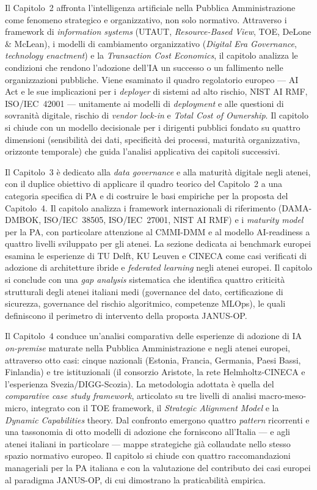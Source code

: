 Il Capitolo~2 affronta l'intelligenza artificiale nella Pubblica Amministrazione come fenomeno strategico e organizzativo, non solo normativo. Attraverso i framework di \textit{information systems} (UTAUT, \textit{Resource-Based View}, TOE, DeLone \& McLean), i modelli di cambiamento organizzativo (\textit{Digital Era Governance}, \textit{technology enactment}) e la \textit{Transaction Cost Economics}, il capitolo analizza le condizioni che rendono l'adozione dell'IA un successo o un fallimento nelle organizzazioni pubbliche. Viene esaminato il quadro regolatorio europeo --- AI Act e le sue implicazioni per i \textit{deployer} di sistemi ad alto rischio, NIST AI RMF, ISO/IEC~42001 --- unitamente ai modelli di \textit{deployment} e alle questioni di sovranità digitale, rischio di \textit{vendor lock-in} e \textit{Total Cost of Ownership}. Il capitolo si chiude con un modello decisionale per i dirigenti pubblici fondato su quattro dimensioni (sensibilità dei dati, specificità dei processi, maturità organizzativa, orizzonte temporale) che guida l'analisi applicativa dei capitoli successivi.

Il Capitolo~3 è dedicato alla \textit{data governance} e alla maturità digitale negli atenei, con il duplice obiettivo di applicare il quadro teorico del Capitolo~2 a una categoria specifica di PA e di costruire le basi empiriche per la proposta del Capitolo~4. Il capitolo analizza i framework internazionali di riferimento (DAMA-DMBOK, ISO/IEC~38505, ISO/IEC~27001, NIST AI RMF) e i \textit{maturity model} per la PA, con particolare attenzione al CMMI-DMM e al modello AI-readiness a quattro livelli sviluppato per gli atenei. La sezione dedicata ai benchmark europei esamina le esperienze di TU Delft, KU Leuven e CINECA come casi verificati di adozione di architetture ibride e \textit{federated learning} negli atenei europei. Il capitolo si conclude con una \textit{gap analysis} sistematica che identifica quattro criticità strutturali degli atenei italiani medi (governance del dato, certificazione di sicurezza, governance del rischio algoritmico, competenze MLOps), le quali definiscono il perimetro di intervento della proposta JANUS-OP.

Il Capitolo~4 conduce un'analisi comparativa delle esperienze di adozione di IA \textit{on-premise} maturate nella Pubblica Amministrazione e negli atenei europei, attraverso otto casi: cinque nazionali (Estonia, Francia, Germania, Paesi Bassi, Finlandia) e tre istituzionali (il consorzio Aristote, la rete Helmholtz-CINECA e l'esperienza Svezia/DIGG-Scozia). La metodologia adottata è quella del \textit{comparative case study framework}, articolato su tre livelli di analisi macro-meso-micro, integrato con il TOE framework, il \textit{Strategic Alignment Model} e la \textit{Dynamic Capabilities} theory. Dal confronto emergono quattro \textit{pattern} ricorrenti e una tassonomia di otto modelli di adozione che forniscono all'Italia --- e agli atenei italiani in particolare --- mappe strategiche già collaudate nello stesso spazio normativo europeo. Il capitolo si chiude con quattro raccomandazioni manageriali per la PA italiana e con la valutazione del contributo dei casi europei al paradigma JANUS-OP, di cui dimostrano la praticabilità empirica.

